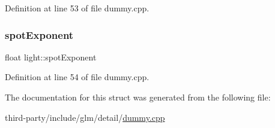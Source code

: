Definition at line 53 of file dummy.\+cpp.

\mbox{\label{structlight_a537f6f54361118f6211c99c26716a848}} 
\subsubsection{\texorpdfstring{spot\+Exponent}{spotExponent}}
{\footnotesize\ttfamily float light\+::spot\+Exponent}



Definition at line 54 of file dummy.\+cpp.



The documentation for this struct was generated from the following file\+:\begin{DoxyCompactItemize}
\item 
third-\/party/include/glm/detail/\hyperlink{dummy_8cpp}{dummy.\+cpp}\end{DoxyCompactItemize}
